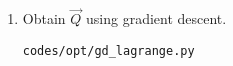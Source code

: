 \begin{enumerate}[label=\thesubsection.\arabic*.,ref=\thesubsection.\theenumi]
%	
\item Obtain $\vec{Q}$ using gradient descent.
\\
\solution
\begin{lstlisting}
codes/opt/gd_lagrange.py
\end{lstlisting}

\end{enumerate}
